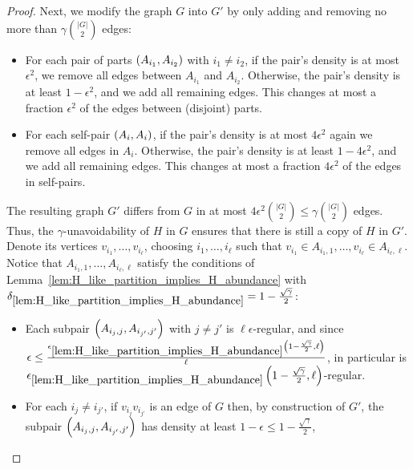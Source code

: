 \begin{proof}
            Next, we modify the graph $G$ into $G'$ by only adding and removing no more than $\gamma {|G| \choose 2}$
            edges:
            \begin{itemize}
                \item For each pair of parts $\left( A_{i_1}, A_{i_2} \right)$ with $i_1 \neq i_2$, if the pair's density is
                    at most $\epsilon^2$, we remove all edges between $A_{i_1}$ and $A_{i_2}$.
                    Otherwise, the pair's density is at least $1 - \epsilon^2$, and we add all remaining edges.
                    This changes at most a fraction $\epsilon^2$ of the edges between (disjoint) parts.
                \item For each self-pair $\left( A_i, A_i \right)$, if the pair's density is at most $4 \epsilon^2$ again we
                    remove all edges in $A_i$.
                    Otherwise, the pair's density is at least $1 - 4 \epsilon^2$, and we add all remaining edges.
                    This changes at most a fraction $4 \epsilon^2$ of the edges in self-pairs.
            \end{itemize}
            The resulting graph $G'$ differs from $G$ in at most $4 \epsilon^2 {|G| \choose 2} \leq \gamma {|G| \choose 2}$
            edges.
            Thus, the $\gamma$-unavoidability of $H$ in $G$ ensures that there is still a copy of $H$ in $G'$.
            Denote its vertices $v_{i_1}, \dots, v_{i_\ell}$, choosing $i_1, \dots, i_\ell$ such that
            $v_{i_1} \in A_{i_1,1}, \dots, v_{i_\ell} \in A_{i_\ell, \ell}$.
            Notice that $A_{i_1,1}, \dots, A_{i_\ell, \ell}$ satisfy the conditions of Lemma~\ref{lem:H_like_partition_implies_H_abundance}
            with $\delta_{\ref{lem:H_like_partition_implies_H_abundance}} = 1 - \frac{\sqrt{\gamma}}{2}$:
            \begin{itemize}
                \item Each subpair $\left( A_{i_j, j}, A_{i_{j'}, j'} \right)$ with $j \neq j'$ is $\ell \epsilon$-regular,
                    and since $\epsilon \leq \frac{\epsilon_{\ref{lem:H_like_partition_implies_H_abundance}} \left( 1 - \frac{\sqrt{\gamma}}{2}, \ell \right)}{\ell}$,
                    in particular is $\epsilon_{\ref{lem:H_like_partition_implies_H_abundance}} \left( 1 - \frac{\sqrt{\gamma}}{2}, \ell \right)$-regular.
                \item For each $i_j \neq i_{j'}$, if $v_{i_j} v_{i_{j'}}$ is an edge of $G$ then, by construction of $G'$,
                    the subpair $\left( A_{i_j, j}, A_{i_{j'}, j'} \right)$ has density at least $1 - \epsilon \leq 1 - \frac{\sqrt{\gamma}}{2}$,

\end{itemize}
\end{proof}
